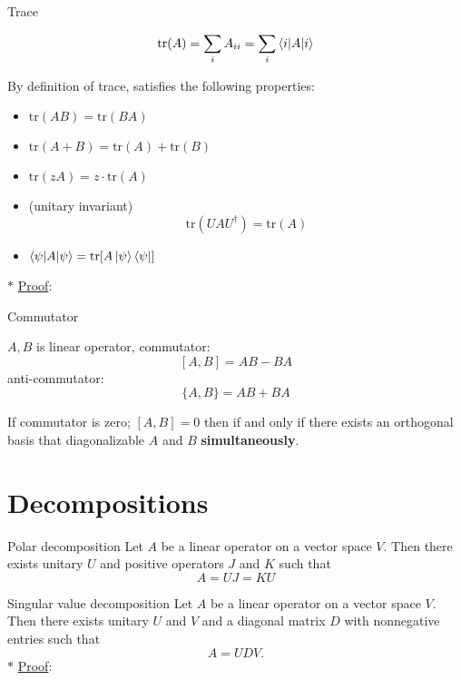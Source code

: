 \documentclass[9pt]{beamer}
\begin{document}
    \begin{frame}{Trace}
        \begin{definition}
        $$\text{tr}(A) = \sum_i A_{ii}= \sum_i \braket{i|A|i}$$
        \end{definition}
        By definition of trace, satisfies the following properties:
        \begin{itemize}
            \item $\text{tr}(AB) = \text{tr}(BA)$
            \item $\text{tr}(A+B) = \text{tr}(A) + \text{tr}(B)$
            \item $\text{tr}(zA) = z \cdot \text{tr}(A)$
            \item (unitary invariant)
            $$\text{tr}(UAU^\dagger) = \text{tr}(A)$$
            \item $\braket{\psi | A |\psi} = \text{tr}[A \ket \psi \bra \psi]$
        \end{itemize}
        $\ast$ \underline{Proof}:
    \end{frame}

    \begin{frame}{Commutator}
        \begin{definition}
            $A, B$ is linear operator,
            commutator:
            $$[A, B] = AB-BA$$
            anti-commutator:
            $$\{A, B\} = AB + BA$$
        \end{definition}
        \begin{theorem}
            If commutator is zero; $[A, B]=0$ then if and only if there exists an orthogonal basis that diagonalizable $A$ and $B$ \textbf{simultaneously}.
        \end{theorem}
    \end{frame}


    \section{Decompositions}
    \begin{frame}{Polar decomposition}
        Let $A$ be a linear operator on a vector space $V$. Then there exists unitary $U$ and positive operators $J$ and $K$ such that
        $$A = UJ = KU$$
    \end{frame}

    \begin{frame}{Singular value decomposition}
        Let $A$ be a linear operator on a vector space $V$. Then there exists unitary $U$ and $V$ and a diagonal matrix $D$ with nonnegative entries such that
        $$A = UDV.$$
        $\ast$ \underline{Proof}:
    \end{frame}
\end{document}
